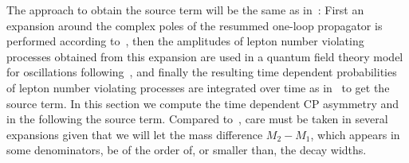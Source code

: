 \documentclass[11pt,a4paper]{article}
\begin{document}
The approach to obtain the source term will be the same as in~\cite{Racker20}: First an expansion around the complex poles of the resummed one-loop propagator is performed according to~\cite{fuchs16}, then the amplitudes of lepton number violating processes obtained from this expansion are used in a quantum field theory model for oscillations following~\cite{Beuthe01}, and finally the resulting time dependent probabilities of lepton number violating processes are integrated over time as in~\cite{Racker20} to get the source term. In this section we compute the time dependent CP asymmetry and in the following the source term. Compared to~\cite{Racker20}, care must be taken in several expansions given that we will let the mass difference $M_2 - M_1$, which appears in some denominators, be of the order of, or smaller than, the decay widths.
\end{document}
